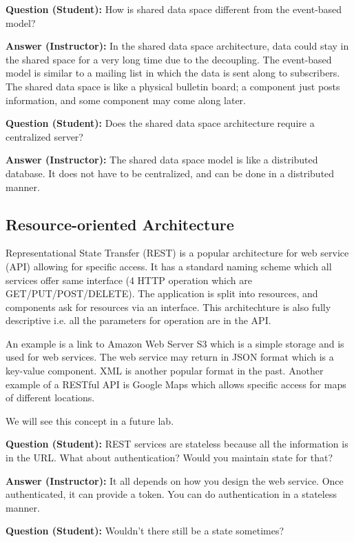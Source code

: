 \documentclass[twoside]{article}
\begin{document}
\textbf{Question (Student): } How is shared data space different from the event-based model?

\textbf{Answer (Instructor): } In the shared data space architecture, data could stay in the shared space for a very long time due to the decoupling. The event-based model is similar to a mailing list in which the data is sent along to subscribers. The shared data space is like a physical bulletin board; a component just posts information, and some component may come along later.

\textbf{Question (Student): } Does the shared data space architecture require a centralized server?

\textbf{Answer (Instructor): } The shared data space model is like a distributed database. It does not have to be centralized, and can be done in a distributed manner.

\subsection{Resource-oriented Architecture}

Representational State Transfer (REST) is a popular architecture for web service (API) allowing for specific access. It has a standard naming scheme which all services offer same interface (4 HTTP operation which are GET/PUT/POST/DELETE). The application is split into resources, and components ask for resources via an interface. This architechture is also fully descriptive i.e. all the parameters for operation are in the API.

An example is a link to Amazon Web Server S3 which is a simple storage and is used for web services. The web service may return in JSON format which is a key-value component. XML is another popular format in the past. Another example of a RESTful API is Google Maps which allows specific access for maps of different locations. 

We will see this concept in a future lab.

\textbf{Question (Student): } REST services are stateless because all the information is in the URL. What about authentication? Would you maintain state for that?

\textbf{Answer (Instructor): } It all depends on how you design the web service. Once authenticated, it can provide a token. You can do authentication in a stateless manner.

\textbf{Question (Student): } Wouldn't there still be a state sometimes?
\end{document}

